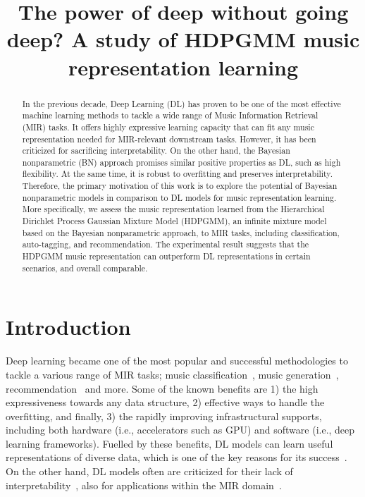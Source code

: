 \documentclass{article}
\title{The power of deep without going deep? A study of HDPGMM music representation learning}
\begin{document}
%
\maketitle
%
\begin{abstract}
    In the previous decade, Deep Learning (DL) has proven to be one of the most effective machine learning methods to tackle a wide range of Music Information Retrieval (MIR) tasks. It offers highly expressive learning capacity that can fit any music representation needed for MIR-relevant downstream tasks. However, it has been criticized for sacrificing interpretability.
    On the other hand, the Bayesian nonparametric (BN) approach promises similar positive properties as DL, such as high flexibility. At the same time, it is robust to overfitting and preserves interpretability. Therefore, the primary motivation of this work is to explore the potential of Bayesian nonparametric models in comparison to DL models for music representation learning.
    More specifically, we assess the music representation learned from the Hierarchical Dirichlet Process Gaussian Mixture Model (HDPGMM), an infinite mixture model based on the Bayesian nonparametric approach, to MIR tasks, including classification, auto-tagging, and recommendation.
    The experimental result suggests that the HDPGMM music representation can outperform DL representations in certain scenarios, and overall comparable.
\end{abstract}
%
\section{Introduction}\label{sec:introduction}

Deep learning became one of the most popular and successful methodologies to tackle a various range of MIR tasks; music classification~\cite{musicclassification:book}, music generation~\cite{briot2019deep}, recommendation~\cite{10.3389/fams.2019.00044} and more. Some of the known benefits are 1) the high expressiveness towards any data structure, 2) effective ways to handle the overfitting, and finally, 3) the rapidly improving infrastructural supports, including both hardware (i.e., accelerators such as GPU) and software (i.e., deep learning frameworks). Fuelled by these benefits, DL models can learn useful representations of diverse data, which is one of the key reasons for its success~\cite{DBLP:conf/ismir/HumphreyBL12}. On the other hand, DL models often are criticized for their lack of interpretability~\cite{DBLP:conf/dsaa/GilpinBYBSK18}, also for applications within the MIR domain~\cite{DBLP:journals/tmm/Sturm14,DBLP:journals/cie/Sturm16}.
\end{document}
